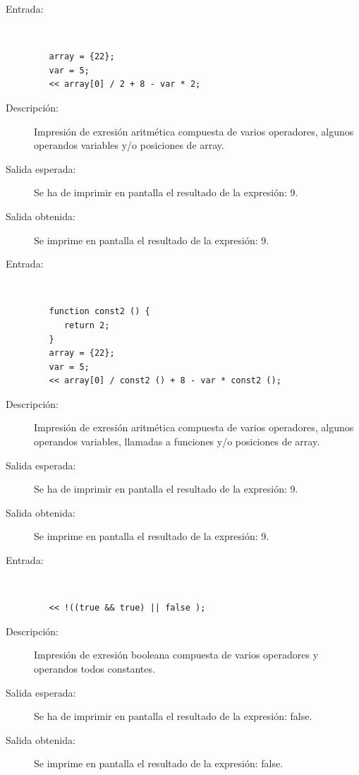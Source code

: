 \begin{framed}
	\begin{description}
		\item [Entrada:] \hfill \\
\begin{lstlisting}
   array = {22};
   var = 5;
   << array[0] / 2 + 8 - var * 2;
\end{lstlisting}
		\item [Descripción:] Impresión de exresión aritmética compuesta de varios operadores, algunos operandos variables y/o posiciones de array.
		\item [Salida esperada:] Se ha de imprimir en pantalla el resultado de la expresión: 9.
		\item [Salida obtenida:] Se imprime en pantalla el resultado de la expresión: 9.
	\end{description}
\end{framed} 

\begin{framed}
	\begin{description}
		\item [Entrada:] \hfill \\
\begin{lstlisting}
   function const2 () {
      return 2;
   }
   array = {22};
   var = 5;
   << array[0] / const2 () + 8 - var * const2 ();
\end{lstlisting}
		\item [Descripción:] Impresión de exresión aritmética compuesta de varios operadores, algunos operandos variables, llamadas a funciones y/o posiciones de array.
		\item [Salida esperada:] Se ha de imprimir en pantalla el resultado de la expresión: 9.
		\item [Salida obtenida:] Se imprime en pantalla el resultado de la expresión: 9.
	\end{description}
\end{framed} 

\begin{framed}
	\begin{description}
		\item [Entrada:] \hfill \\
\begin{lstlisting}
   << !((true && true) || false );
\end{lstlisting}
		\item [Descripción:] Impresión de exresión booleana compuesta de varios operadores y operandos todos constantes.
		\item [Salida esperada:] Se ha de imprimir en pantalla el resultado de la expresión: false.
		\item [Salida obtenida:] Se imprime en pantalla el resultado de la expresión: false.
	\end{description}
\end{framed} 

